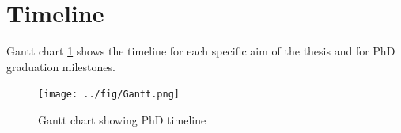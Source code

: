 \documentclass[defaultstyle,11pt]{comps}
\begin{document}
\hypertarget{timeline}{%
\section{Timeline}\label{timeline}}

Gantt chart \ref{fig:Gantt} shows the timeline for each specific aim of the thesis and for PhD graduation milestones.

\begin{figure}
\hypertarget{fig:Gantt}{%
\centering
\texttt{[image: ../fig/Gantt.png]}
\caption{Gantt chart showing PhD timeline}\label{fig:Gantt}
}
\end{figure}


\newpage



\end{document}
